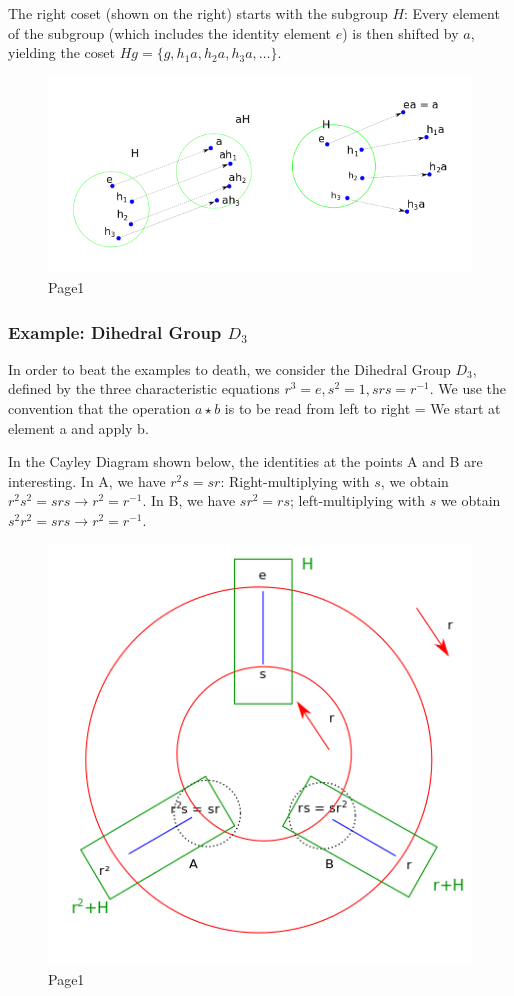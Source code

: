 The right coset (shown on the right) starts with the subgroup \(H\):
Every element of the subgroup (which includes the identity element
\(e\)) is then shifted by \(a\), yielding the coset
\(Hg = \{g, h_1 a, h_2 a, h_3 a, \ldots\}\).

\begin{figure}[H]
\centering
\includegraphics[scale=0.7]{images/groups_05_2.png}
\caption{Page1}
\end{figure}

\subsubsection{Example: Dihedral Group $D_3$}\label{example-dihedral-group-d_3}

In order to beat the examples to death, we consider the Dihedral Group
\(D_3\), defined by the three characteristic equations
\(r^3 = e, s^2=1, srs=r^{-1}\). We use the convention that the operation
\(a\star b\) is to be read from left to right = We start at element a
and apply b.

In the Cayley Diagram shown below, the identities at the points A and B
are interesting. In A, we have \(r^2 s = sr\): Right-multiplying with
\(s\), we obtain \(r^2 s^2 = srs \rightarrow r^2 = r^{-1}\). In B, we
have \(sr^2 = rs\); left-multiplying with \(s\) we obtain
\(s^2 r^2 = srs \rightarrow r^2 = r^{-1}\).

\begin{figure}[H]
\centering
\includegraphics[scale=0.7]{images/groups_05_3.png}
\caption{Page1}
\end{figure}


